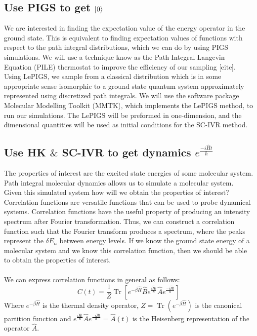 \documentclass[12pt,letterpaper,oneside,final,titlepage]{article}               %
\numberwithin{equation}{section} %
\newcommand{\eBH}{e^{-\beta\hat{H}}}
\newcommand{\emiHt}{e^{\frac{-i\hat{H}t}{\hbar}}}
\newcommand{\eiHt}{e^{\frac{i\hat{H}t}{\hbar}}}
\DeclareMathOperator{\Tr}{Tr}
\begin{document}
\subsection{Use PIGS to get $\ket{0}$}
We are interested in finding the expectation value of the energy operator in the ground state. 
This is equivalent to finding expectation values of functions with respect to the path integral distributions, which we can do by using PIGS simulations.
We will use a technique know as the Path Integral Langevin Equation (PILE) thermostat to improve the efficiency of our sampling [cite].
Using LePIGS, we sample from a classical distribution which is in some appropriate sense isomorphic to a ground state quantum system approximately represented
using discretized path integrals. 
We will use the software package Molecular Modelling Toolkit (MMTK), which implements the LePIGS method, to run our simulations.
The LePIGS will be preformed in one-dimension, and the dimensional quantities will be used as initial conditions for the SC-IVR method.


\subsection{Use HK $\&$ SC-IVR to get dynamics $\emiHt$} 
The properties of interest are the excited state energies of some molecular system. 
Path integral molecular dynamics allows us to simulate a molecular system. 
Given this simulated system how will we obtain the properties of interest?
Correlation functions are versatile functions that can be used to probe dynamical systems.
Correlation functions have the useful property of producing an intensity spectrum after Fourier transformation.
Thus, we can construct a correlation function such that the Fourier transform produces a spectrum, where the peaks
represent the $\delta E_{n}$ between energy levels.
If we know the ground state energy of a molecular system and we know this correlation function, then we should be able to obtain the properties of interest. \\ \\
We can express correlation functions in general as follows:
\begin{equation}
    C(t) = \frac{1}{Z}\Tr[\eBH\hat{B}\eiHt\hat{A}\emiHt]
\end{equation}
Where $\eBH$ is the thermal density operator, $Z = \Tr(\eBH)$ is the canonical partition function 
and $\eiHt\hat{A}\emiHt=\hat{A}(t)$ is the Heisenberg representation of the operator $\hat{A}$.
\end{document}
